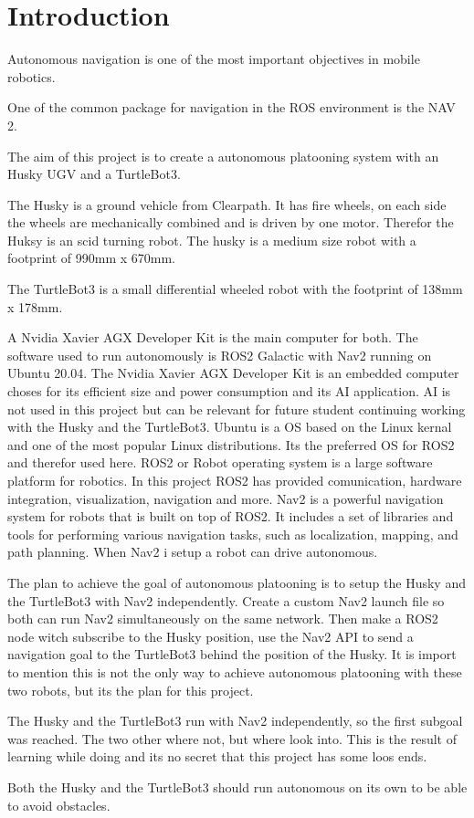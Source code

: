 \chapter{Introduction}


Autonomous navigation is one of the most important objectives in mobile robotics. 

One of the common package for navigation in the ROS environment is the NAV 2. 

The aim of this project is to create a autonomous platooning system with an Husky UGV and a TurtleBot3. 



The Husky is a ground vehicle from Clearpath. It has fire wheels, on each side the wheels are mechanically combined and is driven by one motor. Therefor the Huksy is an scid turning robot. The husky is a medium size robot with a footprint of 990mm x 670mm. 

The TurtleBot3 is a small differential wheeled robot with the footprint of 138mm x 178mm. 

A Nvidia Xavier AGX Developer Kit is the main computer for both. The software used to run autonomously is ROS2 Galactic with Nav2 running on Ubuntu 20.04.  
The Nvidia Xavier AGX Developer Kit is an embedded computer choses for its efficient size and power consumption and its AI application. AI is not used in this project but can be relevant for future student continuing working with the Husky and the TurtleBot3. 
Ubuntu is a OS based on the Linux kernal and one of the most popular Linux distributions. Its the preferred OS for ROS2 and therefor used here.
ROS2 or Robot operating system is a large software platform for robotics. In this project ROS2 has provided comunication, hardware integration, visualization, navigation and more. 
Nav2 is a powerful navigation system for robots that is built on top of ROS2. It includes a set of libraries and tools for performing various navigation tasks, such as localization, mapping, and path planning. When Nav2 i setup a robot can drive autonomous.

The plan to achieve the goal of autonomous platooning is to setup the Husky and the TurtleBot3 with Nav2 independently. Create a custom Nav2 launch file so both can run Nav2 simultaneously on the same network. Then make a ROS2 node witch subscribe to the Husky position, use the Nav2 API to send a navigation goal to the TurtleBot3 behind the position of the Husky. It is import to mention this is not the only way to achieve autonomous platooning with these two robots, but its the plan for this project. 

The Husky and the TurtleBot3 run with Nav2 independently, so the first subgoal was reached. The two other where not, but where look into. This is the result of learning while doing and its no secret that this project has some loos ends. 

Both the Husky and the TurtleBot3 
should run autonomous on its own to be able to avoid obstacles. 